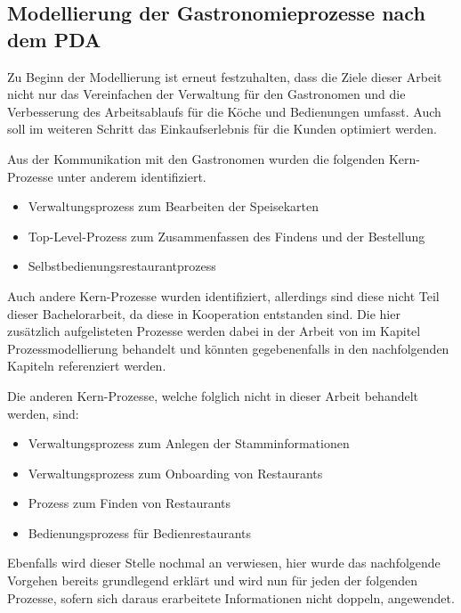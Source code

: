 \subsection{Modellierung der Gastronomieprozesse nach dem \acl{PDA}}
\label{sec:modellierung}
Zu Beginn der Modellierung ist erneut festzuhalten, dass die Ziele dieser Arbeit nicht nur das Vereinfachen der Verwaltung für den Gastronomen und die Verbesserung des Arbeitsablaufs für die Köche und Bedienungen umfasst. Auch soll im weiteren Schritt das Einkaufserlebnis für die Kunden optimiert werden.

Aus der Kommunikation mit den Gastronomen wurden die folgenden Kern-Prozesse unter anderem identifiziert. 

\begin{itemize}
    \item Verwaltungsprozess zum Bearbeiten der Speisekarten
    \item Top-Level-Prozess zum Zusammenfassen des Findens und der Bestellung 
    \item Selbstbedienungsrestaurantprozess
\end{itemize}

Auch andere Kern-Prozesse wurden identifiziert, allerdings sind diese nicht Teil dieser Bachelorarbeit, da diese in Kooperation entstanden sind. Die hier zusätzlich aufgelisteten Prozesse werden dabei in der Arbeit von \cite{ott_konzeption_2025} im Kapitel Prozessmodellierung behandelt und könnten gegebenenfalls in den nachfolgenden Kapiteln referenziert werden. 

Die anderen Kern-Prozesse, welche folglich nicht in dieser Arbeit behandelt werden, sind: 
\begin{itemize}
    \item Verwaltungsprozess zum Anlegen der Stamminformationen
    \item Verwaltungsprozess zum Onboarding von Restaurants
    \item Prozess zum Finden von Restaurants
    \item Bedienungsprozess für Bedienrestaurants
\end{itemize}

Ebenfalls wird dieser Stelle nochmal an  verwiesen, hier wurde das nachfolgende Vorgehen bereits grundlegend erklärt und wird nun für jeden der folgenden Prozesse, sofern sich daraus erarbeitete Informationen nicht doppeln, angewendet.

